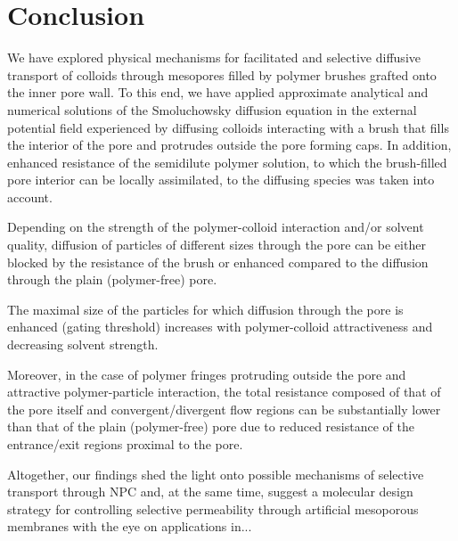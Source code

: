 \documentclass[12pt, a4paper]{article}
\begin{document}

\section{Conclusion}


We have explored physical mechanisms for facilitated and selective diffusive transport of colloids through mesopores filled by polymer brushes grafted onto the inner pore wall. 
To this end, we have applied approximate analytical and numerical solutions of the Smoluchowsky diffusion equation 
in the external potential field experienced by diffusing colloids interacting with a brush that fills the interior of the pore
and protrudes outside the pore forming caps. In addition, enhanced resistance of the semidilute polymer solution, to which the brush-filled pore
interior can be locally assimilated, to the diffusing species was taken into account. 

Depending on the strength of the polymer-colloid interaction and/or solvent quality, diffusion of particles of different sizes
through the pore can be either blocked by the resistance of the brush or enhanced compared to the diffusion through the plain (polymer-free) pore. 

The maximal size of the particles for which diffusion through the pore is enhanced (gating threshold) increases with polymer-colloid attractiveness and decreasing solvent strength.

Moreover, in the case of polymer fringes protruding outside the pore and attractive polymer-particle interaction, the total resistance composed of that of the pore itself 
and convergent/divergent flow regions can be substantially lower than that of the plain (polymer-free) pore due to reduced resistance of the entrance/exit regions proximal to the pore.

Altogether, our findings shed the light onto possible mechanisms of selective transport through NPC and, at the same time, suggest a molecular design strategy for controlling selective
permeability through artificial mesoporous membranes with the eye on applications in...


\printbibliography
\end{document}
